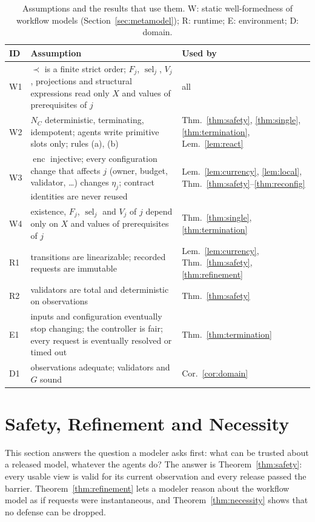 \documentclass[pdflatex,sn-mathphys-num]{sn-jnl}
\theoremstyle{thmstyleone}%
\theoremstyle{thmstyletwo}%
\theoremstyle{thmstylethree}%
\newcommand{\enc}{\operatorname{enc}}
\begin{document}
\begin{table}[!ht]
\caption{Assumptions and the results that use them. W: static well-formedness of workflow models (Section~\ref{sec:metamodel}); R: runtime; E: environment; D: domain.}\label{tab:assumptions}
\footnotesize\setlength{\tabcolsep}{4pt}
\begin{tabular}{@{}lP{88mm}P{26mm}@{}}\toprule
ID & Assumption & Used by\\\midrule
W1 & $\prec$ is a finite strict order; $F_j$, $\operatorname{sel}_j$, $V_j$, projections and structural expressions read only $X$ and values of prerequisites of $j$ & all\\
W2 & $N_C$ deterministic, terminating, idempotent; agents write primitive slots only; rules (a), (b) & Thm.~\ref{thm:safety}, \ref{thm:single}, \ref{thm:termination}, Lem.~\ref{lem:react}\\
W3 & $\enc$ injective; every configuration change that affects $j$ (owner, budget, validator, \ldots) changes $\eta_j$; contract identities are never reused & Lem.~\ref{lem:currency}, \ref{lem:local}, Thm.~\ref{thm:safety}--\ref{thm:reconfig}\\
W4 & existence, $F_j$, $\operatorname{sel}_j$ and $V_j$ of $j$ depend only on $X$ and values of prerequisites of $j$ & Thm.~\ref{thm:single}, \ref{thm:termination}\\
R1 & transitions are linearizable; recorded requests are immutable & Lem.~\ref{lem:currency}, Thm.~\ref{thm:safety}, \ref{thm:refinement}\\
R2 & validators are total and deterministic on observations & Thm.~\ref{thm:safety}\\
E1 & inputs and configuration eventually stop changing; the controller is fair; every request is eventually resolved or timed out & Thm.~\ref{thm:termination}\\
D1 & observations adequate; validators and $G$ sound & Cor.~\ref{cor:domain}\\\bottomrule
\end{tabular}
\end{table}

\section{Safety, Refinement and Necessity}\label{sec:safety}
This section answers the question a modeler asks first: what can be trusted about a released model, whatever the agents do? The answer is Theorem~\ref{thm:safety}: every usable view is valid for its current observation and every release passed the barrier. Theorem~\ref{thm:refinement} lets a modeler reason about the workflow model as if requests were instantaneous, and Theorem~\ref{thm:necessity} shows that no defense can be dropped.
\end{document}
